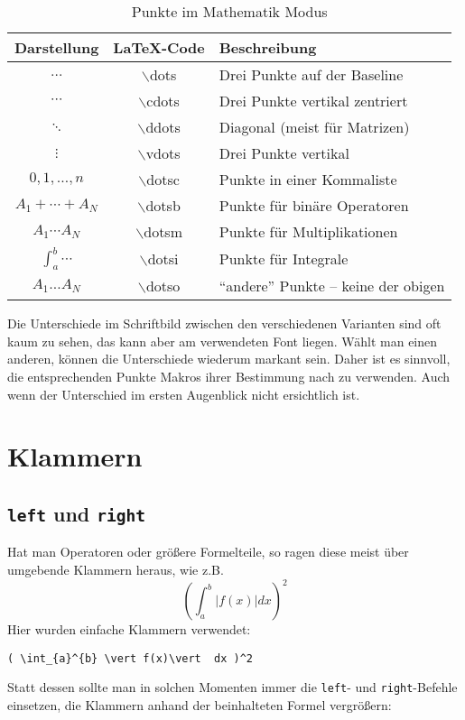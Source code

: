 \begin{table}[h]
\centering
\begin{tabular}{c|c|l}
\hline
\textbf{Darstellung} & \textbf{\LaTeX-Code} & \textbf{Beschreibung} \\
\hline
$\dots$ & $\backslash$dots & Drei Punkte auf der Baseline \\
$\cdots$ & $\backslash$cdots & Drei Punkte vertikal zentriert \\
$\ddots$ & $\backslash$ddots & Diagonal (meist für Matrizen) \\
$\vdots$ & $\backslash$vdots & Drei Punkte vertikal \\
$ 0,1, \dots , n$ & $\backslash$dotsc & Punkte in einer Kommaliste \\
$A_1+\dotsb+A_N$ & $\backslash$dotsb & Punkte für binäre Operatoren \\
$A_1 \dotsm A_N$ & $\backslash$dotsm & Punkte für Multiplikationen \\
$\int_a^b \dotsi$ & $\backslash$dotsi & Punkte für Integrale \\
$A_1\dotso A_N$ & $\backslash$dotso & "`andere"' Punkte -- keine der obigen \\
\hline
\end{tabular}
\caption{Punkte im Mathematik Modus}
\label{tab:dots}
\end{table}

Die Unterschiede im Schriftbild zwischen den verschiedenen Varianten sind oft kaum zu sehen, das kann aber am verwendeten Font liegen. Wählt man einen anderen, können die Unterschiede wiederum markant sein. Daher ist es sinnvoll, die entsprechenden Punkte Makros ihrer Bestimmung nach zu verwenden. Auch wenn der Unterschied im ersten Augenblick nicht ersichtlich ist. 

\section{Klammern}

\subsection{\texttt{left} und \texttt{right}}

Hat man Operatoren oder größere Formelteile, so ragen diese meist über umgebende Klammern heraus, wie z.B.
\begin{equation}\label{eq:int}
( \int_{a}^{b} \vert f(x)\vert  dx )^2
\end{equation}
Hier wurden einfache Klammern verwendet:
\begin{verbatim}
( \int_{a}^{b} \vert f(x)\vert  dx )^2
\end{verbatim}
Statt dessen sollte man in solchen Momenten immer die \texttt{left}- und \texttt{right}-Befehle einsetzen, die Klammern anhand der beinhalteten Formel vergrößern:

